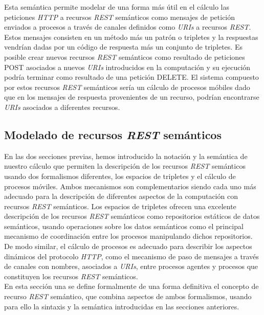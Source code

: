 Esta sem\'antica permite modelar de una forma m\'as \'util en el c\'alculo las peticiones \textit{HTTP} a recursos \textit{REST} sem\'anticos como mensajes de petici\'on enviados a procesos a trav\'es de canales definidos como \textit{URIs} a recursos \textit{REST}. Estos mensajes consisten en un m\'etodo m\'as un patr\'on o tripletes y la respuestas vendr\'ian dadas por un c\'odigo de respuesta m\'as un conjunto de tripletes. Es posible crear nuevos recursos \textit{REST} sem\'anticos como resultado de peticiones POST asociados a nuevos \textit{URIs} introducidos en la computaci\'on y su ejecuci\'on podr\'ia terminar como resultado de una petici\'on DELETE. El sistema compuesto por estos recursos \textit{REST} sem\'anticos ser\'ia un c\'alculo de procesos m\'obiles dado que en los mensajes de respuesta provenientes de un recurso, podr\'ian encontrarse \textit{URIs} asociados a diferentes recursos.

\subsection{Modelado de recursos \textit{REST} sem\'anticos}

En las dos secciones previas, hemos introducido la notaci\'on y la sem\'antica de nuestro c\'alculo que permiten la descripci\'on de los recursos \textit{REST} sem\'anticos usando dos formalismos diferentes, los espacios de tripletes y el c\'alculo de procesos m\'oviles. Ambos mecanismos son complementarios siendo cada uno m\'as adecuado para la descripci\'on de diferentes aspectos de la computaci\'on con recursos \textit{REST} sem\'anticos. Los espacios de tripletes ofrecen una excelente descripci\'on de los recursos \textit{REST} sem\'anticos como repositorios est\'aticos de datos sem\'anticos, usando operaciones sobre los datos sem\'anticos como el principal mecanismo de coordinaci\'on entre los procesos manipulando dichos repositorios. De modo similar, el c\'alculo de procesos es adecuado para describir los aspectos din\'amicos del  protocolo \textit{HTTP}, como el mecanismo de paso de mensajes a trav\'es de canales con nombres, asociados a \textit{URIs}, entre procesos agentes y procesos que constituyen los recursos \textit{REST} sem\'anticos.\\
En esta secci\'on una se define formalmente de una forma definitiva el concepto de recurso \textit{REST} sem\'antico, que combina aspectos de ambos formalismos, usando para ello la sintaxis y la sem\'antica introducidas en las secciones anteriores.\\

